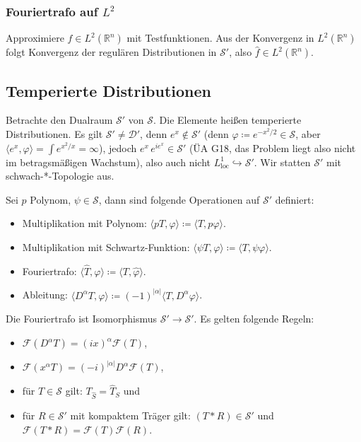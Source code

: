 \documentclass[11pt,a4paper]{scrartcl}
\newcommand{\R}{\mathbb{R}} %
\newcommand{\D}{\mathcal{D}}
\newcommand{\Sc}{\mathcal{S}}
\newcommand{\F}{\mathcal{F}}
\theoremstyle{plain}
\theoremstyle{definition}
\theoremstyle{remark}
\DeclareMathOperator{\loc}{loc}
\begin{document}
\subsubsection{Fouriertrafo auf $L^2$}

Approximiere $f\in L^2(\R^n)$ mit Testfunktionen. Aus der Konvergenz in $L^2(\R^n)$ folgt Konvergenz der regulären Distributionen in $\Sc'$, also $\hat f \in L^2(\R^n)$.

\subsection{Temperierte Distributionen}

Betrachte den Dualraum $\Sc'$ von $\Sc$. Die Elemente heißen temperierte Distributionen. Es gilt $\Sc'\neq \D'$, denn $e^x\not\in \Sc'$ (denn $\varphi\coloneqq e^{-x^2/2}\in \Sc$, aber $\langle e^x, \varphi \rangle = \int e^{x^2/x} = \infty$), jedoch $e^x\, e^{ie^x} \in \Sc'$ (ÜA G18, das Problem liegt also nicht im betragsmäßigen Wachstum), also auch nicht $L^1_{\loc} \hookrightarrow \Sc'$. Wir statten $\Sc'$ mit schwach-*-Topologie aus.

Sei $p$ Polynom, $\psi\in \Sc$, dann sind folgende Operationen auf $\Sc'$ definiert:

\begin{itemize}
    \item Multiplikation mit Polynom: $\langle pT, \varphi \rangle \coloneqq \langle T, p\varphi \rangle$.
    \item Multiplikation mit Schwartz-Funktion: $\langle \psi T, \varphi \rangle \coloneqq \langle T, \psi\varphi \rangle$.
    \item Fouriertrafo: $\langle \hat T, \varphi \rangle \coloneqq \langle T, \hat\varphi \rangle$.
    \item Ableitung: $\langle D^\alpha T, \varphi \rangle \coloneqq (-1)^{|\alpha|} \langle T, D^\alpha \varphi \rangle$.
\end{itemize}

Die Fouriertrafo ist Isomorphismus $\Sc'\to\Sc'$. Es gelten folgende Regeln:

\begin{itemize}
    \item $\F(D^\alpha T) = (ix)^\alpha \F(T)$,
    \item $\F(x^\alpha T) = (-i)^{|\alpha|} D^\alpha \F(T)$,
    \item für $T\in \Sc$ gilt: $T_{\hat S} = \widehat T_S$ und
    \item für $R\in \Sc'$ mit kompaktem Träger gilt: $(T*R)\in \Sc'$ und $\F(T*R)=\F(T)\F(R)$.
\end{itemize}
\end{document}

